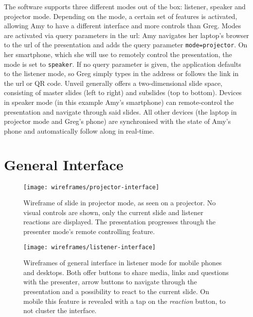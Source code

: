 The software supports three different modes out of the box: listener, speaker and projector mode. Depending on the mode, a certain set of features is activated, allowing Amy to have a different interface and more controls than Greg. Modes are activated via query parameters in the url: Amy navigates her laptop's browser to the url of the presentation and adds the query parameter \texttt{mode=projector}. On her smartphone, which she will use to remotely control the presentation, the mode is set to \texttt{speaker}. If no query parameter is given, the application defaults to the listener mode, so Greg simply types in the address or follows the link in the url or QR code. Unveil generally offers a two-dimensional slide space, consisting of master slides (left to right) and subslides (top to bottom). Devices in speaker mode (in this example Amy's smartphone) can remote-control the presentation and navigate through said slides. All other devices (the laptop in projector mode and Greg's phone) are synchronised with the state of Amy's phone and automatically follow along in real-time.



\section{General Interface}

\begin{figure}
\centering
\texttt{[image: wireframes/projector-interface]}
\caption{Wireframe of slide in projector mode, as seen on a projector. No visual controls are shown, only the current slide and listener reactions are displayed. The presentation progresses through the presenter mode's remote controlling feature.}
\label{fig:design-interface-projector}
\end{figure}

\begin{figure}
\centering
\texttt{[image: wireframes/listener-interface]}
\caption{Wireframes of general interface in listener mode for mobile phones and desktops. Both offer buttons to share media, links and questions with the presenter, arrow buttons to navigate through the presentation and a possibility to react to the current slide. On mobile this feature is revealed with a tap on the \emph{reaction} button, to not cluster the interface.}
\label{fig:design-interface-listener}
\end{figure}


